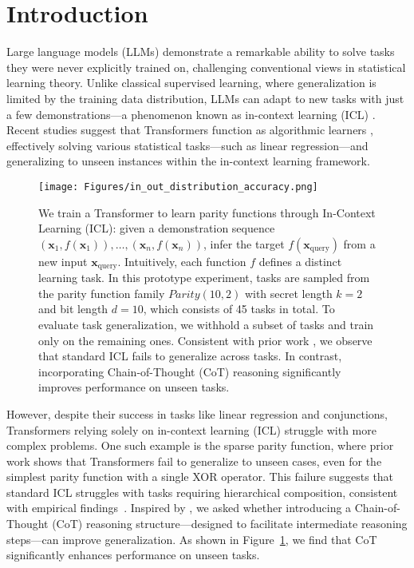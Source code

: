 \section{Introduction}

Large language models (LLMs) demonstrate a remarkable ability to solve tasks they were never explicitly trained on, challenging conventional views in statistical learning theory. Unlike classical supervised learning, where generalization is limited by the training data distribution, LLMs can adapt to new tasks with just a few demonstrations—a phenomenon known as in-context learning (ICL) \cite{brown2020language, wei2022emergent, garg2022can}. Recent studies suggest that Transformers function as algorithmic learners \cite{li2023transformers, bai2023transformers}, effectively solving various statistical tasks—such as linear regression—and generalizing to unseen instances within the in-context learning framework.

 \begin{figure}[t]
    \centering
    \texttt{[image: Figures/in\_out\_distribution\_accuracy.png]}
    \vspace{-2mm}
    \caption{We train a Transformer to learn parity functions through In-Context Learning (ICL): given a demonstration sequence \((\bm x_1, f(\bm x_1)), \dots, (\bm x_n, f(\bm x_n))\), infer the target \( f(\bm x_{\mathrm{query}}) \) from a new input $\bm x_{\mathrm{query}}$. Intuitively, each function \( f \) defines a distinct learning task. In this prototype experiment, tasks are sampled from the parity function family \(Parity (10,2)\) with secret length $k=2$ and bit length $d=10$, which consists of 45 tasks in total. To evaluate task generalization, we withhold a subset of tasks and train only on the remaining ones. Consistent with prior work \cite{bhattamishra2024understanding}, we observe
    that standard ICL fails to generalize across tasks. In contrast, incorporating Chain-of-Thought (CoT) reasoning significantly improves performance on unseen tasks.}
    \label{fig:in_out_dist_prelim}
    \vspace{-5mm}
\end{figure}


However, despite their success in tasks like linear regression and conjunctions, Transformers relying solely on in-context learning (ICL) struggle with more complex problems. One such example is the sparse parity function, where prior work \cite{bhattamishra2024understanding} shows that Transformers fail to generalize to unseen cases, even for the simplest parity function with a single XOR operator. This failure suggests that standard ICL struggles with tasks requiring hierarchical composition, consistent with empirical findings~\cite{an2023context, xu2024do}. Inspired by \cite{wen2024sparse, kim2025transformers}, we asked whether introducing a Chain-of-Thought (CoT) reasoning structure—designed to facilitate intermediate reasoning steps—can improve generalization. As shown in Figure~\ref{fig:in_out_dist_prelim}, we find that CoT significantly enhances performance on unseen tasks.







